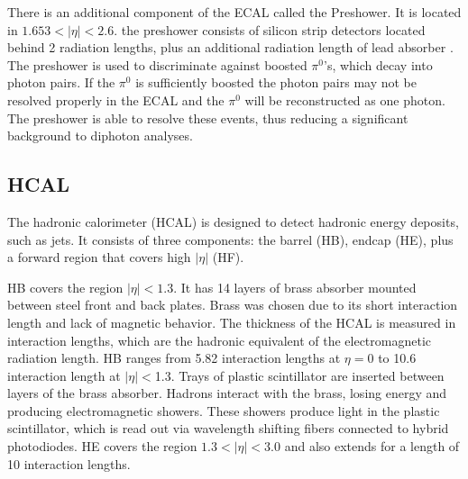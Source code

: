 \documentclass[oneside, letterpaper, oldfontcommands]{memoir}
\begin{document}
\qquad There is an additional component of the ECAL called the Preshower. It is located in $1.653 < |\eta| < 2.6$. the preshower consists of silicon strip detectors located behind 2 radiation lengths, plus an additional radiation length of lead absorber \cite{Cockerill:2008td}. The preshower is used to discriminate against boosted $\pi^{0}$'s, which decay into photon pairs. If the $\pi^{0}$ is sufficiently boosted the photon pairs may not be resolved properly in the ECAL and the $\pi^{0}$ will be reconstructed as one photon. The preshower is able to resolve these events, thus reducing a significant background to diphoton analyses.


\subsection{HCAL}\label{hcal}

\qquad The hadronic calorimeter (HCAL) is designed to detect hadronic energy deposits, such as jets. It consists of three components: the barrel (HB), endcap (HE), plus a forward region that covers high $|\eta|$ (HF). 

\qquad HB covers the region $|\eta| < 1.3$. It has 14 layers of brass absorber mounted between steel front and back plates. Brass was chosen due to its short interaction length and lack of magnetic behavior. The thickness of the HCAL is measured in interaction lengths, which are the hadronic equivalent of the electromagnetic radiation length. HB ranges from 5.82 interaction lengths at $\eta = 0$ to 10.6 interaction length at $|\eta| < $1.3.  Trays of plastic scintillator are inserted between layers of the brass absorber. Hadrons interact with the brass, losing energy and producing electromagnetic showers. These showers produce light in the plastic scintillator, which is read out via wavelength shifting fibers connected to hybrid photodiodes. HE covers the region $1.3 < |\eta| < 3.0$ and also extends for a length of 10 interaction lengths.
\end{document}
